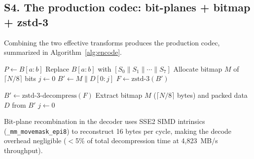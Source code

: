 \documentclass[10pt,twocolumn,letterpaper]{article}
\begin{document}
\subsection*{S4. The production codec: bit-planes + bitmap + zstd-3}

Combining the two effective transforms produces the production codec, summarized in Algorithm~\ref{alg:encode}.

\begin{algorithm}[h]
\SetAlgoLined
\caption{SinglePress chunk encoding (production codec).}
\label{alg:encode}
\KwIn{VOCSC-encoded chunk buffer $B$ of length $N$ bytes; plane~0 region $[a, b)$}
$P \gets B[a:b]$
Replace $B[a:b]$ with $[S_0 \| S_1 \| \cdots \| S_7]$\;
Allocate bitmap $M$ of $\lceil N/8 \rceil$ bits\;
$j \gets 0$\;
$B' \gets M \| D[0:j]$
$F \gets \text{zstd-3}(B')$\;
\;
\end{algorithm}

\begin{algorithm}[h]
\SetAlgoLined
\caption{SinglePress chunk decoding (production codec).}
\label{alg:decode}
\KwIn{Compressed frame $F$; original chunk size $N$; plane~0 region $[a, b)$}
$B' \gets \text{zstd-3-decompress}(F)$\;
Extract bitmap $M$ ($\lceil N/8 \rceil$ bytes) and packed data $D$ from $B'$\;
$j \gets 0$\;
\;
\end{algorithm}

Bit-plane recombination in the decoder uses SSE2 SIMD intrinsics (\texttt{\_mm\_movemask\_epi8}) to reconstruct 16 bytes per cycle, making the decode overhead negligible ($<$5\% of total decompression time at 4{,}823~MB/s throughput).
\end{document}
